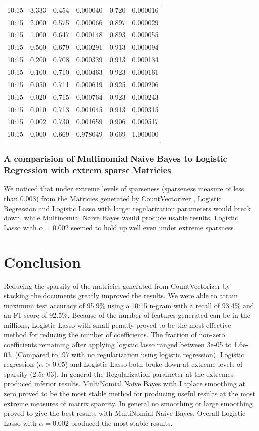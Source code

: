 \documentclass[11pt]{article}
\begin{document}
{\begin{tabular}{ |p{2cm}||p{2cm}|p{2cm}|p{2cm}|p{2cm}|p{2cm}|  }
10:15 &  3.333 & 0.454 & 0.000040 & 0.720 & 0.000016 \\
10:15 &  2.000 & 0.575 & 0.000066 & 0.897 & 0.000029 \\
10:15 &  1.000 & 0.647 & 0.000148 & 0.893 & 0.000055 \\
10:15 &  0.500 & 0.679 & 0.000291 & 0.913 & 0.000094 \\
10:15 &  0.200 & 0.708 & 0.000339 & 0.913 & 0.000134 \\
10:15 &  0.100 & 0.710 & 0.000463 & 0.923 & 0.000161 \\
10:15 &  0.050 & 0.711 & 0.000619 & 0.925 & 0.000206 \\
10:15 &  0.020 & 0.715 & 0.000764 & 0.923 & 0.000243 \\
10:15 &  0.010 & 0.713 & 0.001045 & 0.913 & 0.000315 \\
10:15 &  0.002 & 0.730 & 0.001659 & 0.906 & 0.000517 \\
10:15 &  0.000 & 0.669 & 0.978049 & 0.669 & 1.000000 \\
 \hline
\end{tabular}

\subsubsection{A comparision of Multinomial Naive Bayes to Logistic Regression with extrem sparse Matricies}
We noticed that under extreme levels of sparseness (sparseness measure of less than $0.003$) from the Matricies 
generated by CountVectorizer , Logistic Regression and Logistic Lasso with larger regularization parameters would break down, 
while Multinomial Naive Bayes would produce usable results. Logistic Lasso with $\alpha=0.002$ seemed to hold up
well even under extreme sparsness.


\section{Conclusion}
Reducing the sparsity of the matricies generated from CountVectorizer by stacking the documents greatly improved the results.
We were able to attain maximum test accuracy of 95.9$\%$ using a 10:15 n-gram with a recall of 93.4$\%$ and an F1 score of 92.5$\%$.
Because of the number of features generated can be in the millions, Logistic Lasso with small penatly proved to be the most effective 
method for reducing the number of coefficients.
The fraction of non-zero coefficients remaining after applying logistic lasso
ranged between 3e-05 to 1.6e-03.  (Compared to .97 with no regularization using logistic regression).
Logistic regression ($\alpha > 0.05$) and Logistic Lasso both broke down at extreme levels of sparsity 
(2.5e-03).
In general the Regularization parameter at the extremes produced inferior results.
MultiNomial Naive Bayes with Laplace smoothing at zero proved to be the most stable method for producing useful results at the
most extreme measures of matrix sparcity.  In general no smoothing or large smoothing proved to give the best results with
MultiNomial Naive Bayes. Overall Logistic Lasso with $\alpha = 0.002$ produced the most stable results.

}
\end{document}
